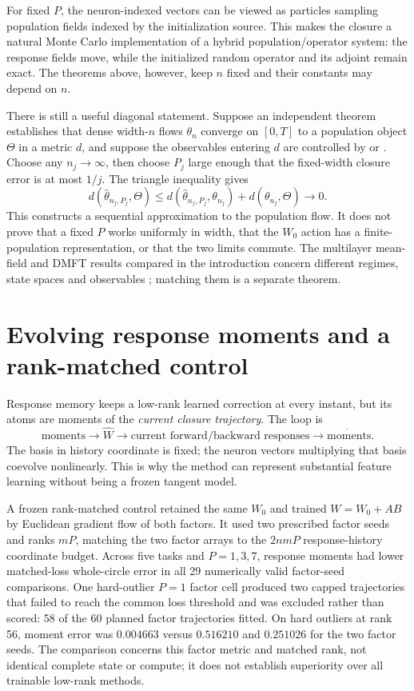 \documentclass[11pt]{article}
\theoremstyle{definition}
\theoremstyle{remark}
\begin{document}
For fixed $P$, the neuron-indexed vectors can be viewed as particles sampling
population fields indexed by the initialization source.  This makes the closure
a natural Monte Carlo implementation of a hybrid population/operator system:
the response fields move, while the initialized random operator and its adjoint
remain exact.  The theorems above, however, keep $n$ fixed and their constants
may depend on $n$.

There is still a useful diagonal statement.  Suppose an independent theorem
establishes that dense width-$n$ flows $\theta_n$ converge on $[0,T]$ to a
population object $\Theta$ in a metric $d$, and suppose the observables entering
$d$ are controlled by  or .  Choose any
$n_j\to\infty$, then choose $P_j$ large enough that the fixed-width closure
error is at most $1/j$.  The triangle inequality gives
\[
 d(\widehat\theta_{n_j,P_j},\Theta)
 \le d(\widehat\theta_{n_j,P_j},\theta_{n_j})+d(\theta_{n_j},\Theta)
 \longrightarrow0.
\]
This constructs a sequential approximation to the population flow.  It does
not prove that a fixed $P$ works uniformly in width, that the $W_0$ action has a
finite-population representation, or that the two limits commute.  The
multilayer mean-field and DMFT results compared in the introduction concern
different regimes, state spaces and observables
\citep{nguyen2023rigorous,bordelon2022dmft}; matching them is a separate
theorem.

\section{Evolving response moments and a rank-matched control}

Response memory keeps a low-rank learned correction at every instant, but its
atoms are moments of the \emph{current closure trajectory}.  The loop is
\[
 \text{moments}\longrightarrow\widehat W
 \longrightarrow\text{current forward/backward responses}
 \longrightarrow\dot{\text{moments}}.
\]
The basis in history coordinate is fixed; the neuron vectors multiplying that
basis coevolve nonlinearly.  This is why the method can represent substantial
feature learning without being a frozen tangent model.

A frozen rank-matched control retained the same $W_0$ and trained
$W=W_0+AB$ by Euclidean gradient flow of both factors.  It used two prescribed
factor seeds and ranks $mP$, matching the two factor arrays to the
$2nmP$ response-history coordinate budget.  Across five tasks and
$P=1,3,7$, response moments had lower matched-loss whole-circle error in all
29 numerically valid factor-seed comparisons.  One hard-outlier $P=1$ factor
cell produced two capped trajectories that failed to reach the common loss
threshold and was excluded rather than scored: 58 of the 60 planned factor
trajectories fitted.  On hard outliers at rank 56, moment error was
$0.004663$ versus $0.516210$ and $0.251026$ for the two factor seeds.
The comparison concerns this factor metric and matched rank, not identical
complete state or compute; it does not establish superiority over all
trainable low-rank methods.
\end{document}
